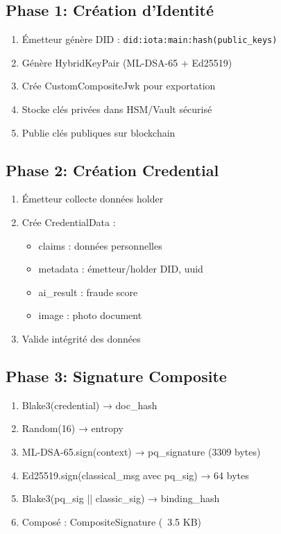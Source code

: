 \documentclass[12pt,a4paper]{report}
\begin{document}
\subsection{Phase 1: Création d'Identité}

\begin{enumerate}
  \item Émetteur génère DID : \texttt{did:iota:main:hash(public\_keys)}
  \item Génère HybridKeyPair (ML-DSA-65 + Ed25519)
  \item Crée CustomCompositeJwk pour exportation
  \item Stocke clés privées dans HSM/Vault sécurisé
  \item Publie clés publiques sur blockchain
\end{enumerate}

\subsection{Phase 2: Création Credential}

\begin{enumerate}
  \item Émetteur collecte données holder
  \item Crée CredentialData :
  \begin{itemize}
    \item claims : données personnelles
    \item metadata : émetteur/holder DID, uuid
    \item ai\_result : fraude score
    \item image : photo document
  \end{itemize}
  \item Valide intégrité des données
\end{enumerate}

\subsection{Phase 3: Signature Composite}

\begin{enumerate}
  \item Blake3(credential) → doc\_hash
  \item Random(16) → entropy
  \item ML-DSA-65.sign(context) → pq\_signature (3309 bytes)
  \item Ed25519.sign(classical\_msg avec pq\_sig) → 64 bytes
  \item Blake3(pq\_sig || classic\_sig) → binding\_hash
  \item Composé : CompositeSignature (~3.5 KB)
\end{enumerate}
\end{document}
